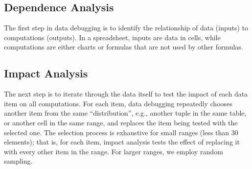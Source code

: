 
\subsection{Dependence Analysis}

The first step in data debugging is to identify the relationship of
data (inputs) to computations (outputs).
In a spreadsheet, inputs are data in cells, while computations are
either charts or formulas that are not used by other formulas. 




\subsection{Impact Analysis}

The next step is to iterate through the data itself to test the impact of each
data item on all computations. For each item, data debugging repeatedly
chooses another item from the same ``distribution'', e.g., another tuple in
the same table, or another cell in the same range, and replaces the item being
tested with the selected one. The selection process is exhaustive for small
ranges (less than 30 elements); that is, for each item, impact analysis tests
the effect of replacing it with every other item in the range. For larger
ranges, we employ random sampling.

